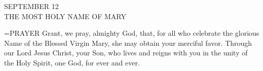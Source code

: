 \begin{center}\normalsize SEPTEMBER 12\\
\footnotesize THE MOST HOLY NAME OF MARY\\
\end{center}

\hangindent=\parindent \small{PRAYER 
Grant, we pray, almighty God,
that, for all who celebrate the glorious Name
of the Blessed Virgin Mary,
she may obtain your merciful favor.
Through our Lord Jesus Christ, your Son,
who lives and reigns with you in the unity of the Holy Spirit,
one God, for ever and ever.\\}
 


